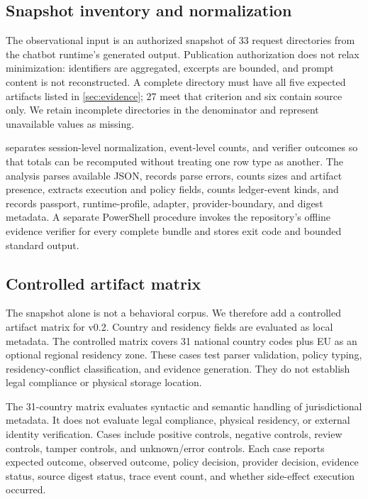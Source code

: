 \subsection{Snapshot inventory and normalization}
The observational input is an authorized snapshot of 33 request directories
from the chatbot runtime's generated output.  Publication authorization does
not relax minimization: identifiers are aggregated, excerpts are bounded, and
prompt content is not reconstructed.  A complete directory must have all five
expected artifacts listed in \cref{sec:evidence}; 27 meet that criterion and
six contain source only.  We retain incomplete directories in the denominator
and represent unavailable values as missing.

\begin{table}[t]
\centering
\caption{Committed normalized datasets. Values are regenerated from the
authorized artifact snapshot.}
\label{tab:dataset}

\end{table}

 separates session-level normalization, event-level counts,
and verifier outcomes so that totals can be recomputed without treating one
row type as another.  The analysis parses available JSON, records parse
errors, counts sizes and artifact presence, extracts execution and policy
fields, counts ledger-event kinds, and records passport, runtime-profile,
adapter, provider-boundary, and digest metadata.  A separate PowerShell
procedure invokes the repository's offline evidence verifier for every
complete bundle and stores exit code and bounded standard output.

\subsection{Controlled artifact matrix}
The snapshot alone is not a behavioral corpus.  We therefore add a controlled
artifact matrix for v0.2.  Country and residency fields are evaluated as local
metadata.  The controlled matrix covers 31 national country codes plus EU as an
optional regional residency zone.  These cases test parser validation, policy
typing, residency-conflict classification, and evidence generation.  They do
not establish legal compliance or physical storage location.

The 31-country matrix evaluates syntactic and semantic handling of
jurisdictional metadata. It does not evaluate legal compliance, physical
residency, or external identity verification.  Cases include positive controls,
negative controls, review controls, tamper controls, and unknown/error
controls.  Each case reports expected outcome, observed outcome, policy
decision, provider decision, evidence status, source digest status, trace event
count, and whether side-effect execution occurred.

